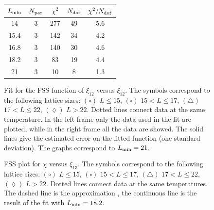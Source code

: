 \documentclass[12pt]{article}
\newcommand{\text}{\rm}
\begin{document}
\begin{figure}
\begin{center}
{\scriptsize
\begin{tabular}{|c|c|c|c|c|}
\hline
$L_{\text{min}}$ & $N_{\text{par}}$ & $\chi^2$ & $N_{\text{dof}}$ &
$\chi^2/N_{\text{dof}}$ \\ 
\hline
 14 &        3  &     277 & 49  &    5.6\\
 15.4 &       3   &    142  &34   &   4.2\\
 16.8 &       3   &    140  & 30  &    4.6\\
 18.2 &       3   &    83  & 19  &    4.4\\
 21 &       3   &    10  & 8   &    1.3\\
\hline
\end{tabular}
}
\end{center}
\caption{ Fit for the FSS function of $\xi_{12}$ versus $\xi_{12}$. 
The symbols correspond to the
following lattice sizes: $(\circ)$ $ L\le 15$, $( \square )$ $ 15 < L \le 17$,
$(\triangle)$ $ 17 < L \le 22$, $(\lozenge)$ $ L > 22$.
Dotted lines connect data at the same temperature.
In the left frame only the data used in the fit are plotted,
while in the right frame all the data are showed.
The solid lines give the estimated error on
the fitted function (one standard deviation).
The graphs correspond to  $L_{\text{min}}=21$.}
\label{fig:fitfss_xi12}
\end{figure}

\begin{figure}
\vspace*{-2truecm} 
\begin{center}
\end{center}
\vspace*{-1.5truecm} 
\caption{FSS plot for $\chi$ versus $\xi_{13}$. 
The symbols correspond to the
following lattice sizes: $(\circ)$ $ L\le 15$, $( \square )$ $ 15 < L \le 17$,
$(\triangle)$ $ 17 < L \le 22$, $(\lozenge)$ $ L > 22$.
Dotted lines connect data at the same temperatures.
The dashed line is the approximation ,
the continuous line is the
result of the fit with $L_{\rm min} = 18.2$.}
\label{fig:fssplot_s1_xi13}
\end{figure}                                                                    
\end{document}
